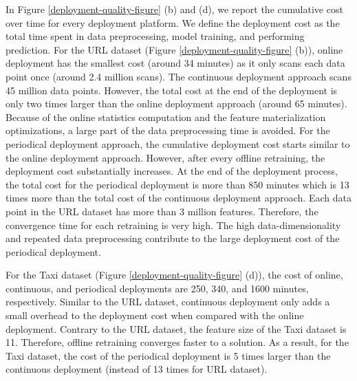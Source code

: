 \begin{figure*}[t]
\centering
\resizebox{\textwidth}{!}{}
\caption{Model Quality and Training cost for different deployment approaches}
\label{deployment-quality-figure}
\end{figure*}
In Figure \ref{deployment-quality-figure} (b) and (d), we report the cumulative cost over time for every deployment platform.
We define the deployment cost as the total time spent in data preprocessing, model training, and performing prediction.
For the URL dataset (Figure \ref{deployment-quality-figure} (b)), online deployment has the smallest cost (around 34 minutes) as it only scans each data point once (around 2.4 million scans).  
The continuous deployment approach scans 45 million data points.
However, the total cost at the end of the deployment is only two times larger than the online deployment approach (around 65 minutes).  
Because of the online statistics computation and the feature materialization optimizations, a large part of the data preprocessing time is avoided.
For the periodical deployment approach, the cumulative deployment cost starts similar to the online deployment approach.
However, after every offline retraining, the deployment cost substantially increases.
At the end of the deployment process, the total cost for the periodical deployment is more than 850 minutes which is 13 times more than the total cost of the continuous deployment approach.
Each data point in the URL dataset has more than 3 million features.
Therefore, the convergence time for each retraining is very high.
The high data-dimensionality and repeated data preprocessing contribute to the large deployment cost of the periodical deployment.

For the Taxi dataset (Figure \ref{deployment-quality-figure} (d)), the cost of online, continuous, and periodical deployments are 250, 340, and 1600 minutes, respectively.
Similar to the URL dataset, continuous deployment only adds a small overhead to the deployment cost when compared with the online deployment.
Contrary to the URL dataset, the feature size of the Taxi dataset is 11.
Therefore, offline retraining converges faster to a solution.
As a result, for the Taxi dataset, the cost of the periodical deployment is 5 times larger than the continuous deployment (instead of 13 times for URL dataset). 

